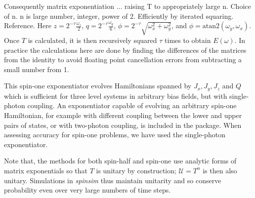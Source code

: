 \documentclass{jors}
\begin{document}
		Consequently matrix exponentiation ... raising T to appropriately large n.
		Choice of n. n is large number, integer, power of 2. Efficiently by iterated squaring. Reference. %
		Here \(z = 2^{-\tau}\frac{\omega_z}{2}\), \(q = 2^{-\tau}\frac{\omega_q}{6}\), \(\phi = 2^{-\tau}\sqrt{\omega_x^2 + \omega_y^2}\), and \(\phi = \mathrm{atan}2(\omega_y, \omega_x)\).
		Once \(T\) is calculated, it is then recursively squared \(\tau\) times to obtain \(E(\omega)\).
		In practice the calculations here are done by finding the differences of the matrices from the identity to avoid floating point cancellation errors from subtracting a small number from 1.

		This spin-one exponentiator evolves Hamiltonians spanned by \(J_x, J_y, J_z\) and \(Q\) which is sufficient for three level systems in arbitrary bias fields, but with single-photon coupling.
		An exponentiator capable of evolving an arbitrary spin-one Hamiltonian, for example with different coupling between the lower and upper pairs of states, or with two-photon coupling, is included in the package.
		When assessing accuracy for spin-one problems, we have used the single-photon exponentiator.

		Note that, the methods for both spin-half and spin-one use analytic forms of matrix exponentials so that \(T\) is unitary by construction; \(\mathcal{U}=T^n\) is then also unitary.
		Simulations in \emph{spinsim} thus maintain unitarity and so conserve probability even over very large numbers of time steps.
\end{document}
